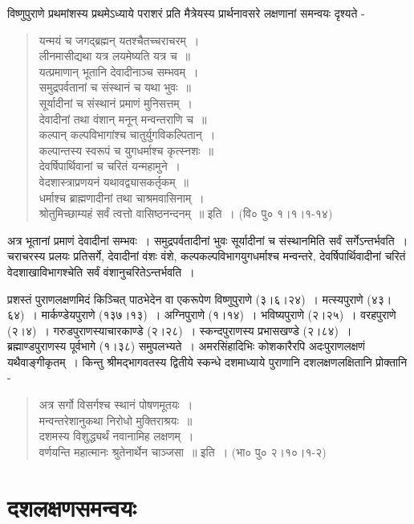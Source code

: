 विष्णुपुराणे प्रथमांशस्य प्रथमेऽध्याये पराशरं प्रति मैत्रेयस्य प्रार्थनावसरे लक्षणानां समन्वयः दृश्यते -
\begin{verse}
यन्मयं च जगद्ब्रह्मन् यतश्चैतच्चराचरम्~।\\
लीनमासीद्यथा यत्र लयमेष्यति यत्र च~॥\\
यत्प्रमाणान् भूतानि देवादीनाञ्च सम्भवम्~।\\
समुद्रपर्वतानां च संस्थानं च यथा भुवः~॥\\
सूर्यादीनां च संस्थानं प्रमाणं मुनिसत्तम्~।\\
देवादीनां तथा वंशान् मनून् मन्वन्तराणि च~॥\\
कल्पान् कल्पविभागांश्च चातुर्युगविकल्पितान्~।\\
कल्पान्तस्य स्वरूपं च युगधर्माश्च कृत्स्नशः~॥\\
देवर्षिपार्थिवानां च चरितं यन्महामुने~।\\
वेदशास्त्राप्रणयनं यथावद्व्यासकर्तृकम्~॥\\
धर्माश्च ब्राह्मणादीनां तथा चाश्रमवासिनाम्~।\\
श्रोतुमिच्छाम्यहं सर्वं त्वत्तो वासिष्ठनन्दनम्~॥ इति~। (वि० पु० १।१।१-१४)
\end{verse}
अत्र भूतानां प्रमाणं देवादीनां सम्भवः~। समुद्रपर्वतादीनां भुवः सूर्यादीनां च संस्थानमिति सर्वं सर्गेऽन्तर्भवति~। चराचरस्य प्रलयः प्रतिसर्गे, देवादीनां वंशः वंशे, कल्पकल्पविभागयुगधर्माश्च मन्वन्तरे, देवर्षिपार्थिवादीनां चरितं वेदशाखाविभागश्चेति सर्वं वंशानुचरितेऽन्तर्भवति~।

प्रशस्तं पुराणलक्षणमिदं किञ्चित् पाठभेदेन वा एकरूपेण विष्णुपुराणे (३।६।२४)~। मत्स्यपुराणे (४३।६४)~। मार्कण्डेयपुराणे (१३७।१३)~। अग्निपुराणे (१।१४)~। भविष्यपुराणे (२।२५)~। वरहपुराणे (२।४)~। गरुडपुराणस्याचारकाण्डे (२।२८)~। स्कन्दपुराणस्य प्रभासखण्डे (२।८४)~। ब्रह्माण्डपुराणस्य पूर्वभागे (१।३८) समुपलभ्यते~। अमरसिंहादिभिः कोशकारैरपि अदःपुराणलक्षणं यथैवाङ्गीकृतम्~। किन्तु श्रीमद्भागवतस्य द्वितीये स्कन्धे दशमाध्याये पुराणानि दशलक्षणलक्षितानि प्रोक्तानि -
\begin{verse}
अत्र सर्गो विसर्गश्च स्थानं पोषणमूतयः~।\\
मन्वन्तरेशानुकथा निरोधो मुक्तिराश्रयः~॥\\
दशमस्य विशुद्ध्यर्थं नवानामिह लक्षणम्~।\\
वर्णयन्ति महात्मानः श्रुतेनार्थेन चाञ्जसा~॥ इति~। (भा० पु० २।१०।१-२)
\end{verse}

\section*{दशलक्षणसमन्वयः}

